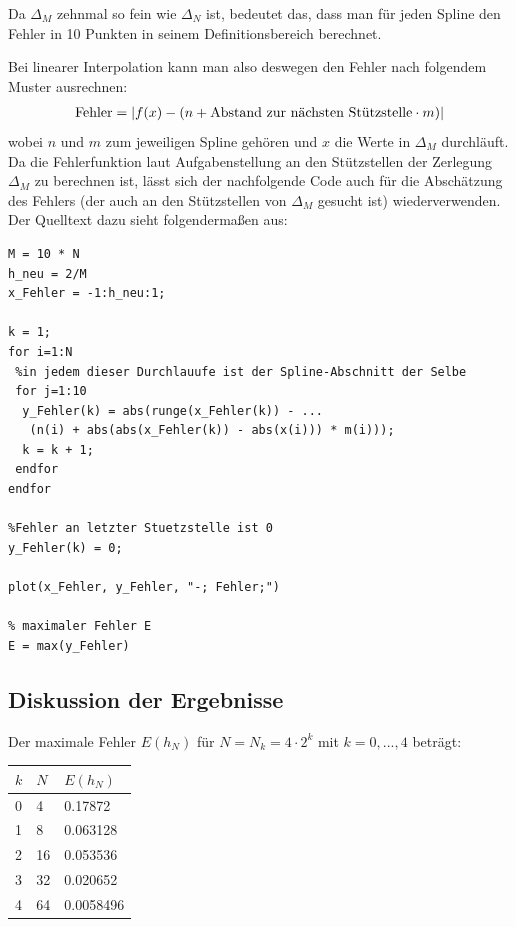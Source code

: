 \documentclass[ngerman,a4paper]{texmf/tex/latex/mathscript/mathscript}
\begin{document}
	Da $\Delta_M$ zehnmal so fein wie $\Delta_N$ ist, bedeutet das, dass man für jeden Spline den Fehler in 10 Punkten in seinem Definitionsbereich berechnet.
	
	Bei linearer Interpolation kann man also deswegen den Fehler nach folgendem Muster ausrechnen:
	\begin{align}
		\text{Fehler} = \vert f(x) - (n + \text{Abstand zur nächsten Stützstelle}\cdot m) \vert \notag
	\end{align}
	wobei $n$ und $m$ zum jeweiligen Spline gehören und $x$ die Werte in $\Delta_M$ durchläuft. Da die Fehlerfunktion laut Aufgabenstellung an den Stützstellen der Zerlegung $\Delta_M$ zu berechnen ist, lässt sich der nachfolgende Code auch für die Abschätzung des Fehlers (der auch an den Stützstellen von $\Delta_M$ gesucht ist) wiederverwenden. Der Quelltext dazu sieht folgendermaßen aus:
\begin{lstlisting}
M = 10 * N
h_neu = 2/M
x_Fehler = -1:h_neu:1;

k = 1;
for i=1:N
 %in jedem dieser Durchlauufe ist der Spline-Abschnitt der Selbe
 for j=1:10
  y_Fehler(k) = abs(runge(x_Fehler(k)) - ...
   (n(i) + abs(abs(x_Fehler(k)) - abs(x(i))) * m(i)));
  k = k + 1;
 endfor
endfor

%Fehler an letzter Stuetzstelle ist 0
y_Fehler(k) = 0;

plot(x_Fehler, y_Fehler, "-; Fehler;")

% maximaler Fehler E
E = max(y_Fehler)
\end{lstlisting}
	
	\subsection{Diskussion der Ergebnisse}
	
	Der maximale Fehler $E(h_N)$ für $N=N_k=4\cdot 2^k$ mit $k=0,...,4$ beträgt:
	\begin{center}
		\begin{tabular}{ll|l}
			$k$ & $N$ & $E(h_N)$ \\
			\hline
			0 & 4 & 0.17872 \\
			\hline
			1 & 8 & 0.063128 \\
			\hline 
			2 & 16 & 0.053536 \\
			\hline 
			3 & 32 & 0.020652 \\
			\hline 
			4 & 64 & 0.0058496 \\
		\end{tabular}
	\end{center} 
\end{document}
